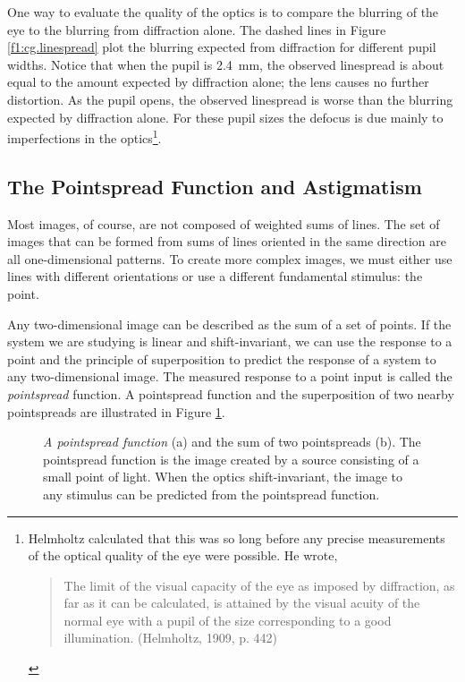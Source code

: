 One way to evaluate the quality of the optics
is to compare the blurring of the eye to
the blurring from diffraction alone.
The dashed lines in Figure \ref{f1:cg.linespread}
plot the blurring expected from diffraction for
different pupil widths.
Notice that when the pupil is 2.4~mm,
the observed linespread is about equal to the amount expected
by diffraction alone; the lens causes no further distortion.
As the pupil opens,
the observed linespread is worse than 
the blurring expected by diffraction alone.
For these pupil sizes the defocus
is due mainly to imperfections in the optics\footnote{
Helmholtz calculated that this was so
long before any precise measurements of the optical
quality of the eye were possible.
He wrote,
\begin{quote}
The limit of the visual capacity of the eye as imposed
by diffraction, as far as it can be calculated, is attained
by the visual acuity of the normal eye with a pupil of the
size corresponding to a good illumination.
(Helmholtz, 1909, p. 442)
\end{quote}
}.

\subsection*{The Pointspread Function and Astigmatism}
Most images, of course, are not composed of weighted sums of lines.
The set of images that can be formed from sums of lines oriented
in the same direction are all
one-dimensional patterns.
To create more complex images, we must either
use lines with different orientations or use a different
fundamental stimulus: the point.

Any two-dimensional image can be described
as the sum of a set of points.
If the system we are studying is linear and
shift-invariant, we can use the response to a point
and the principle of superposition
to predict the response of a system to
any two-dimensional image.
The measured response to a point input is
called the {\em pointspread} function.
A pointspread function and the superposition of two nearby
pointspreads are illustrated in Figure \ref{f1:pointspread}.
\begin{figure}
\centerline{
}
\caption[Pointspread Function]{
{\em A pointspread function}
(a) and the sum of two pointspreads (b).
The pointspread function is the image created
by a source consisting of a small point of light.
When the optics shift-invariant,
the image to any stimulus
can be predicted from the pointspread function.
}
\label{f1:pointspread}
\end{figure}

